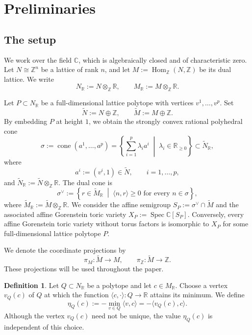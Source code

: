 \documentclass[11pt]{amsart}
\numberwithin{equation}{section}
\theoremstyle{plain}
\theoremstyle{definition}
\newtheorem{definition}[theorem]{Definition}
\newcommand{\0}{$0$-mutable}
\renewcommand{\1}{$1$-rigid}
\renewcommand{\0}{$0$-mutable}
\begin{document}
\section{Preliminaries}



\subsection{The setup}\label{sub the setup}

We work over the field \(\mathbb{C}\), which is algebraically closed and of
characteristic zero. Let
$
N\cong \mathbb{Z}^n
$
be a lattice of rank \(n\), and let
$
M:=\operatorname{Hom}_{\mathbb{Z}}(N,\mathbb{Z})
$
be its dual lattice. We write
\[
N_{\mathbb{R}}:=N\otimes_{\mathbb{Z}}\mathbb{R},
\qquad
M_{\mathbb{R}}:=M\otimes_{\mathbb{Z}}\mathbb{R}.
\]

Let \(P\subset N_{\mathbb{R}}\) be a full-dimensional lattice polytope
with vertices \(v^1,\dots,v^p\). Set
\[
\widetilde N:=N\oplus\mathbb{Z},
\qquad
\widetilde M:=M\oplus\mathbb{Z}.
\]
By embedding \(P\) at height \(1\), we obtain the strongly convex rational
polyhedral cone
\begin{equation}\label{polytope}
\sigma
:=
\operatorname{cone}(a^1,\ldots,a^p)
=
\left\{
\sum_{i=1}^p\lambda_i a^i
\;\middle|\;
\lambda_i\in\mathbb{R}_{\geq 0}
\right\}
\subset \widetilde N_{\mathbb{R}},
\end{equation}
where
\[
a^i:=(v^i,1)\in \widetilde N,
\qquad i=1,\dots,p,
\]
and
$
\widetilde N_{\mathbb{R}}
:=
\widetilde N\otimes_{\mathbb{Z}}\mathbb{R}
$. 
The dual cone is
\[
\sigma^\vee
:=
\left\{
r\in\widetilde M_{\mathbb{R}}
\;\middle|\;
\langle n,r\rangle\geq 0
\text{ for every }n\in\sigma
\right\},
\]
where
$
\widetilde M_{\mathbb{R}}
:=
\widetilde M\otimes_{\mathbb{Z}}\mathbb{R}.
$
We consider the affine semigroup
$
S_P:=\sigma^\vee\cap\widetilde M
$
and the associated affine Gorenstein toric variety
$
X_P:=\operatorname{Spec}\mathbb{C}[S_P].
$
Conversely, every affine Gorenstein toric variety without torus factors is
isomorphic to \(X_P\) for some full-dimensional lattice polytope \(P\).

We denote the coordinate projections by
\[
\pi_M:\widetilde M\longrightarrow M,
\qquad
\pi_{\mathbb{Z}}:\widetilde M\longrightarrow\mathbb{Z}.
\]
These projections will be used throughout the paper.

\begin{definition}\label{d:eta(c)}
Let \(Q\subset N_{\mathbb{R}}\) be a polytope and let
\(c\in M_{\mathbb{R}}\). Choose a vertex \(v_Q(c)\) of \(Q\) at which
the function
$
\langle c,\cdot\rangle:Q\longrightarrow\mathbb{R}
$
attains its minimum. We define
\[
\eta_Q(c)
:=
-\min_{v\in Q}\langle v,c\rangle
=
-\langle v_Q(c),c\rangle.
\]
Although the vertex \(v_Q(c)\) need not be unique, the value
\(\eta_Q(c)\) is independent of this choice.
\end{definition}
\end{document}
